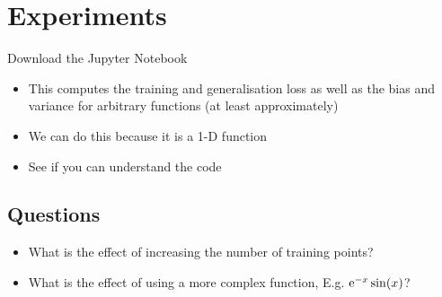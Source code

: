 \documentclass[11pt]{article}
\newcommand{\e}[1]{{\rm e}^{#1}}
\begin{document}
\section{Experiments}
\label{sec:org8c03876}
Download the Jupyter Notebook

\begin{itemize}
\item This computes the training and generalisation loss as well as
the bias and variance for arbitrary functions (at least approximately)
\item We can do this because it is a 1-D function
\item See if you can understand the code
\end{itemize}

\subsection{Questions}
\label{sec:orgb71bdf2}
\begin{itemize}
\item What is the effect of increasing the number of training points?
\item What is the effect of using a more complex function, E.g. \(\e{-x} \sin(x)\)?
\end{itemize}
\end{document}
